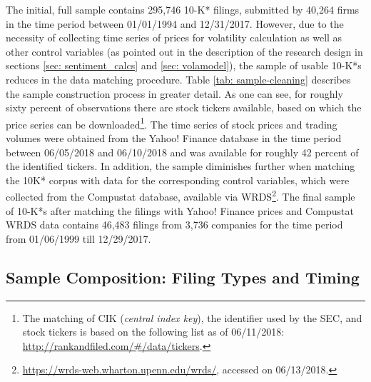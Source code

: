 The initial, full sample contains 295,746 10-K* filings, submitted by 40,264 firms in the time period between 01/01/1994 and 12/31/2017. However, due to the necessity of collecting time series of prices for volatility calculation as well as other control variables (as pointed out in the description of the research design in sections \ref{sec: sentiment_calcs} and \ref{sec: volamodel}), the sample of usable 10-K*s reduces in the data matching procedure. Table \ref{tab: sample-cleaning} describes the sample construction process in greater detail. As one can see, for roughly sixty percent of observations there are stock tickers available, based on which the price series can be downloaded\footnote{The matching of CIK (\textit{central index key}), the identifier used by the SEC, and stock tickers is based on the following list as of 06/11/2018: \url{http://rankandfiled.com/\#/data/tickers}.}. The time series of stock prices and trading volumes were obtained from the Yahoo! Finance database in the time period between 06/05/2018 and 06/10/2018 and was available for roughly 42 percent of the identified tickers. In addition, the sample diminishes further when matching the 10K* corpus with data for the corresponding control variables, which were collected from the Compustat database, available via WRDS\footnote{\url{https://wrds-web.wharton.upenn.edu/wrds/}, accessed on 06/13/2018.}. The final sample of 10-K*s after matching the filings with Yahoo! Finance prices and Compustat WRDS data contains 46,483 filings from 3,736 companies for the time period from 01/06/1999 till 12/29/2017. 

\subsection{Sample Composition: Filing Types and Timing}
\label{ssec: data_sample_timingtypes}


